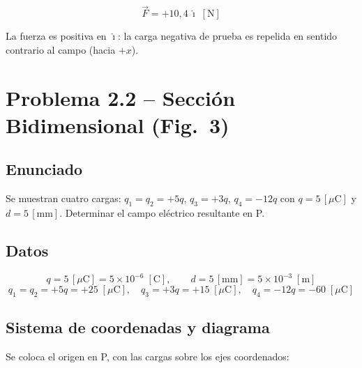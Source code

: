 \documentclass[12pt,letterpaper]{article}
\begin{document}
\[
    \boxed{\vec{F} = +10{,}4\,\hat{\imath}\;[\text{N}]}
\]

La fuerza es positiva en $\hat{\imath}$: la carga negativa de prueba es
repelida en sentido contrario al campo (hacia $+x$).

\clearpage

\section*{\textcolor{ubbblue}{Problema 2.2 \;--\; Secci\'on Bidimensional (Fig.\ 3)}}

\subsection*{Enunciado}

Se muestran cuatro cargas: $q_1 = q_2 = +5q$, $q_3 = +3q$, $q_4 = -12q$
con $q = 5\,[\mu\text{C}]$ y $d = 5\,[\text{mm}]$.
Determinar el campo el\'ectrico resultante en P.

\subsection*{Datos}

\[
    q = 5\,[\mu\text{C}] = 5\times10^{-6}\;[\text{C}], \qquad
    d = 5\,[\text{mm}] = 5\times10^{-3}\;[\text{m}]
\]
\[
    q_1 = q_2 = +5q = +25\;[\mu\text{C}], \quad
    q_3 = +3q = +15\;[\mu\text{C}], \quad
    q_4 = -12q = -60\;[\mu\text{C}]
\]

\subsection*{Sistema de coordenadas y diagrama}

Se coloca el origen en P, con las cargas sobre los ejes coordenados:
\end{document}
